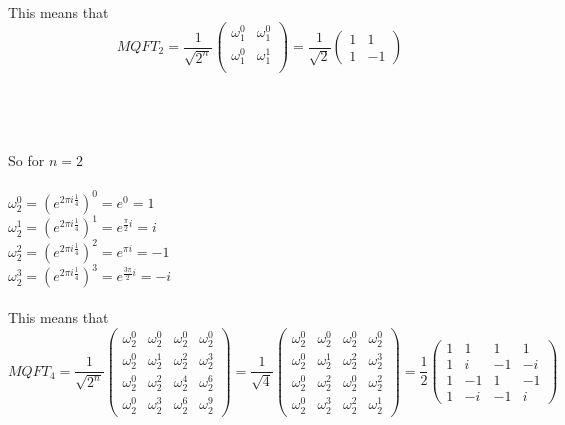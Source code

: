 \documentclass{article}
\begin{document}
\\
This means that 
\[MQFT_2 = 
\frac{1}{\sqrt{2^n}} \begin{pmatrix} 
\omega_1^0 & \omega_1^0 \\ 
\omega_1^0 & \omega_1^1 \\ 
\end{pmatrix} = \frac{1}{\sqrt{2}} \begin{pmatrix} 1 & 1 \\ 1 & -1 \end{pmatrix} \]\\
\\ \\ \\
So for $n=2$\\ \\
\(\omega_2^0 = (e^{2\pi i \frac{1}{4}})^{0} = e^{0} = 1 \) \\
\(\omega_2^1 = (e^{2\pi i \frac{1}{4}})^{1} = e^{\frac{\pi}{2}i} = i \)\\
\(\omega_2^2 = (e^{2\pi i \frac{1}{4}})^{2} = e^{\pi i } = -1 \)\\
\(\omega_2^3 = (e^{2\pi i \frac{1}{4}})^{3} = e^{\frac{3 \pi}{2}i} = -i \)\\
\\
This means that 
\[MQFT_4 =  
\frac{1}{\sqrt{2^n}} \begin{pmatrix} 
\omega_2^0 & \omega_2^0 & \omega_2^0 & \omega_2^0 \\ 
\omega_2^0 & \omega_2^1 & \omega_2^2 & \omega_2^3 \\ 
\omega_2^0 & \omega_2^2 & \omega_2^4 & \omega_2^6 \\ 
\omega_2^0 & \omega_2^3 & \omega_2^6 & \omega_2^9
\end{pmatrix} =
\frac{1}{\sqrt{4}} \begin{pmatrix} 
\omega_2^0 & \omega_2^0 & \omega_2^0 & \omega_2^0 \\ 
\omega_2^0 & \omega_2^1 & \omega_2^2 & \omega_2^3 \\ 
\omega_2^0 & \omega_2^2 & \omega_2^0 & \omega_2^2 \\ 
\omega_2^0 & \omega_2^3 & \omega_2^2 & \omega_2^1
\end{pmatrix} =
\frac{1}{2} \begin{pmatrix} 1 & 1 & 1 & 1 \\ 1 & i & -1 & -i \\ 1 & -1 & 1 & -1 \\ 1 & -i & -1 & i \end{pmatrix} \]\\
\end{document}
